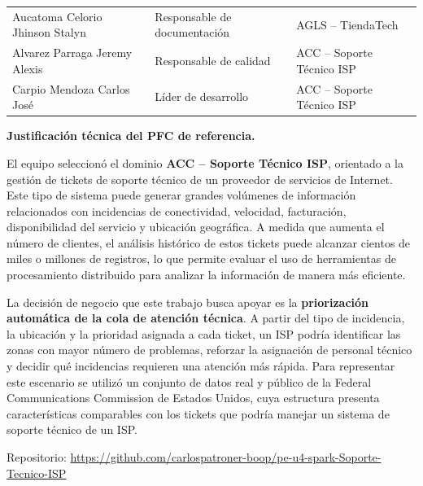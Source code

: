 \documentclass[11pt,a4paper]{article}
\begin{document}
\begin{titlepage}
\begin{tabular}{p{5.0cm} p{4.2cm} p{3.8cm}}
            Aucatoma Celorio Jhinson Stalyn
            & Responsable de documentación
            & AGLS -- TiendaTech \\

            Alvarez Parraga Jeremy Alexis
            & Responsable de calidad
            & ACC -- Soporte Técnico ISP \\

            Carpio Mendoza Carlos José
            & Líder de desarrollo
            & ACC -- Soporte Técnico ISP \\

            \bottomrule
        \end{tabular}

        \vspace{0.7cm}

        \begin{minipage}{0.94\textwidth}
            \small

            \textbf{Justificación técnica del PFC de referencia.}

            El equipo seleccionó el dominio \textbf{ACC -- Soporte Técnico ISP},
            orientado a la gestión de tickets de soporte técnico de un proveedor de
            servicios de Internet. Este tipo de sistema puede generar grandes volúmenes
            de información relacionados con incidencias de conectividad, velocidad,
            facturación, disponibilidad del servicio y ubicación geográfica. A medida
            que aumenta el número de clientes, el análisis histórico de estos tickets
            puede alcanzar cientos de miles o millones de registros, lo que permite
            evaluar el uso de herramientas de procesamiento distribuido para analizar
            la información de manera más eficiente.

            La decisión de negocio que este trabajo busca apoyar es la
            \textbf{priorización automática de la cola de atención técnica}. A partir
            del tipo de incidencia, la ubicación y la prioridad asignada a cada ticket,
            un ISP podría identificar las zonas con mayor número de problemas, reforzar
            la asignación de personal técnico y decidir qué incidencias requieren una
            atención más rápida. Para representar este escenario se utilizó un conjunto
            de datos real y público de la Federal Communications Commission de Estados
            Unidos, cuya estructura presenta características comparables con los tickets
            que podría manejar un sistema de soporte técnico de un ISP.

        \end{minipage}

        \vfill

        {\small
        Repositorio:
        \url{https://github.com/carlospatroner-boop/pe-u4-spark-Soporte-Tecnico-ISP}}

    \end{titlepage}
\end{document}
